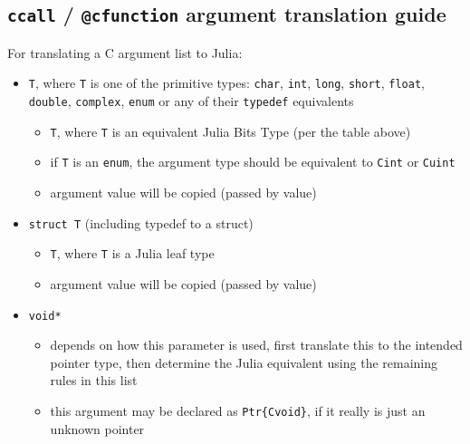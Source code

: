 \hypertarget{14464013813592582244}{}


\subsection{\texttt{ccall} / \texttt{@cfunction} argument translation guide}



For translating a C argument list to Julia:



\begin{itemize}
\item \texttt{T}, where \texttt{T} is one of the primitive types: \texttt{char}, \texttt{int}, \texttt{long}, \texttt{short}, \texttt{float}, \texttt{double}, \texttt{complex}, \texttt{enum} or any of their \texttt{typedef} equivalents

\begin{itemize}
\item \texttt{T}, where \texttt{T} is an equivalent Julia Bits Type (per the table above)


\item if \texttt{T} is an \texttt{enum}, the argument type should be equivalent to \texttt{Cint} or \texttt{Cuint}


\item argument value will be copied (passed by value)

\end{itemize}

\item \texttt{struct T} (including typedef to a struct)

\begin{itemize}
\item \texttt{T}, where \texttt{T} is a Julia leaf type


\item argument value will be copied (passed by value)

\end{itemize}

\item \texttt{void*}

\begin{itemize}
\item depends on how this parameter is used, first translate this to the intended pointer type, then determine the Julia equivalent using the remaining rules in this list


\item this argument may be declared as \texttt{Ptr\{Cvoid\}}, if it really is just an unknown pointer


\end{itemize}
\end{itemize}
